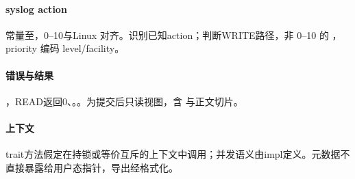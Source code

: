 \paragraph{syslog action}

常量至，0--10与Linux 对齐。识别已知action；判断WRITE路径，非 0--10 的 ，priority 编码 level/facility。

\paragraph{错误与结果}

，READ返回0、。。为提交后只读视图，含  与正文切片。

\paragraph{上下文}

trait方法假定在持锁或等价互斥的上下文中调用；并发语义由impl定义。元数据不直接暴露给用户态指针，导出经格式化。
